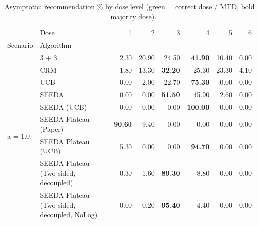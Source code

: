 \begin{table}[H]
\centering
\caption{Asymptotic: recommendation \% by dose level (green = correct dose / MTD, bold = majority dose).}
\label{tab:asym_rec_by_dose}
\begin{tabular}{llrrrrrr}
\toprule
 & Dose & 1 & 2 & 3 & 4 & 5 & 6 \\
Scenario & Algorithm &  &  &  &  &  &  \\
\midrule
\multirow[c]{9}{*}{a = 1.0} & 3 + 3 & 2.30 & 20.90 & {\cellcolor[HTML]{C8E6C9}} 24.50 & \bfseries 41.90 & 10.40 & 0.00 \\
 & CRM & 1.80 & 13.30 & {\cellcolor[HTML]{C8E6C9}} \bfseries 32.20 & 25.30 & 23.30 & 4.10 \\
 & UCB & 0.00 & 2.00 & {\cellcolor[HTML]{C8E6C9}} 22.70 & \bfseries 75.30 & 0.00 & 0.00 \\
 & SEEDA & 0.00 & 0.00 & {\cellcolor[HTML]{C8E6C9}} \bfseries 51.50 & 45.90 & 2.60 & 0.00 \\
 & SEEDA (UCB) & 0.00 & 0.00 & {\cellcolor[HTML]{C8E6C9}} 0.00 & \bfseries 100.00 & 0.00 & 0.00 \\
 & SEEDA Plateau (Paper) & \bfseries 90.60 & 9.40 & {\cellcolor[HTML]{C8E6C9}} 0.00 & 0.00 & 0.00 & 0.00 \\
 & SEEDA Plateau (UCB) & 5.30 & 0.00 & {\cellcolor[HTML]{C8E6C9}} 0.00 & \bfseries 94.70 & 0.00 & 0.00 \\
 & SEEDA Plateau (Two-sided, decoupled) & 0.30 & 1.60 & {\cellcolor[HTML]{C8E6C9}} \bfseries 89.30 & 8.80 & 0.00 & 0.00 \\
 & SEEDA Plateau (Two-sided, decoupled, NoLog) & 0.00 & 0.20 & {\cellcolor[HTML]{C8E6C9}} \bfseries 95.40 & 4.40 & 0.00 & 0.00 \\
\bottomrule
\end{tabular}
\end{table}
